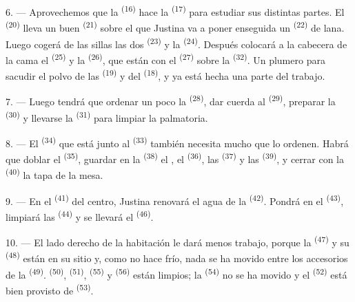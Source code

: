 6. --- Aprovechemos que la  \textsuperscript{(16)} hace la
 \textsuperscript{(17)} para estudiar sus distintas partes. El
 \textsuperscript{(20)} lleva un buen 
\textsuperscript{(21)} sobre el que Justina va a poner enseguida un
 \textsuperscript{(22)} de lana. Luego cogerá de las sillas las dos
 \textsuperscript{(23)} y la  \textsuperscript{(24)}. Después
colocará a la cabecera de la cama el  \textsuperscript{(25)} y la
 \textsuperscript{(26)}, que están con el 
\textsuperscript{(27)} sobre la  \textsuperscript{(32)}. Un
plumero para sacudir el polvo de las  \textsuperscript{(19)} y del
 \textsuperscript{(18)}, y ya está hecha una parte del trabajo.

7. --- Luego tendrá que ordenar un poco la 
\textsuperscript{(28)}, dar cuerda al  \textsuperscript{(29)}, preparar
la  \textsuperscript{(30)} y llevarse la 
\textsuperscript{(31)} para limpiar la palmatoria.

\VUsaut{5.0mm}
\VUsaut{3.0mm}

8. --- El  \textsuperscript{(34)} que está junto al 
\textsuperscript{(33)} también necesita mucho que lo ordenen. Habrá que doblar el
 \textsuperscript{(35)}, guardar en la 
\textsuperscript{(38)} el , el  \textsuperscript{(36)}, las
 \textsuperscript{(37)} y las  \textsuperscript{(39)}, y cerrar
con la  \textsuperscript{(40)} la tapa de la mesa.

9. --- En el  \textsuperscript{(41)} del centro, Justina renovará el
agua de la  \textsuperscript{(42)}. Pondrá  en el
 \textsuperscript{(43)}, limpiará las 
\textsuperscript{(44)} y se llevará el  \textsuperscript{(46)}.

10. --- El lado derecho de la habitación le dará menos trabajo, porque la
 \textsuperscript{(47)} y su  \textsuperscript{(48)} están en
su sitio y, como no hace frío, nada se ha movido entre los accesorios de
la  \textsuperscript{(49)}.  \textsuperscript{(50)},
 \textsuperscript{(51)},  \textsuperscript{(55)} y
 \textsuperscript{(56)} están limpios; la  \textsuperscript{(54)} no se ha movido y el 
\textsuperscript{(52)} está bien provisto de  \textsuperscript{(53)}.

